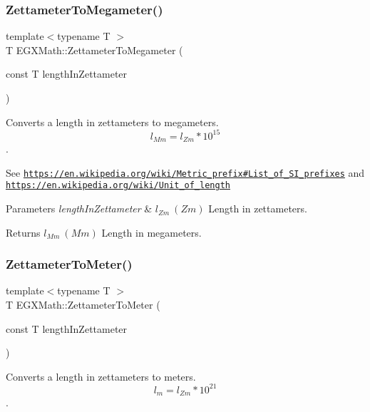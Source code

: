 \subsubsection{\texorpdfstring{Zettameter\+To\+Megameter()}{ZettameterToMegameter()}}
{\footnotesize\ttfamily template$<$typename T $>$ \\
T E\+G\+X\+Math\+::\+Zettameter\+To\+Megameter (\begin{DoxyParamCaption}\item[{const T}]{length\+In\+Zettameter }\end{DoxyParamCaption})}



Converts a length in zettameters to megameters. \[ l_{Mm}=l_{Zm} * 10^{15} \]. 

See \href{https://en.wikipedia.org/wiki/Metric_prefix#List_of_SI_prefixes}{\tt https\+://en.\+wikipedia.\+org/wiki/\+Metric\+\_\+prefix\#\+List\+\_\+of\+\_\+\+S\+I\+\_\+prefixes} and \href{https://en.wikipedia.org/wiki/Unit_of_length}{\tt https\+://en.\+wikipedia.\+org/wiki/\+Unit\+\_\+of\+\_\+length} 
\begin{DoxyParams}{Parameters}
{\em length\+In\+Zettameter} & $ l_{Zm}\ (Zm)$ Length in zettameters. \\
\hline
\end{DoxyParams}
\begin{DoxyReturn}{Returns}
$ l_{Mm}\ (Mm)$ Length in megameters. 
\end{DoxyReturn}
\mbox{\label{group___e_g_x_math-_conversions-_length_conversions-_zettameter-_s_i_ga4965fffbfd10b795231942d8de4e1f2d}} 
\subsubsection{\texorpdfstring{Zettameter\+To\+Meter()}{ZettameterToMeter()}}
{\footnotesize\ttfamily template$<$typename T $>$ \\
T E\+G\+X\+Math\+::\+Zettameter\+To\+Meter (\begin{DoxyParamCaption}\item[{const T}]{length\+In\+Zettameter }\end{DoxyParamCaption})}



Converts a length in zettameters to meters. \[ l_{m}=l_{Zm} * 10^{21} \]. 


